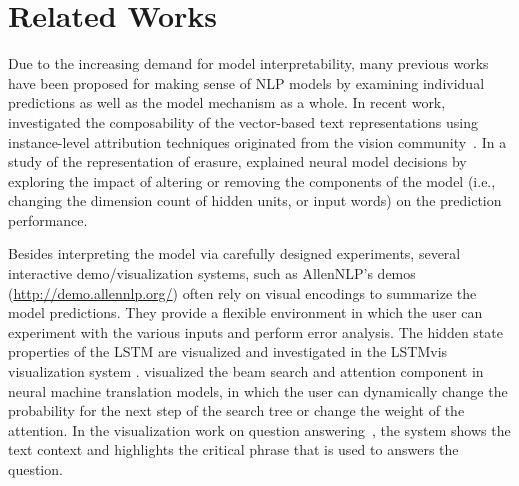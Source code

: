 \section{Related Works}
Due to the increasing demand for model interpretability, many previous works have been proposed for making sense of NLP models by examining individual predictions as well as the model mechanism as a whole. 
%
In recent work,~\citet{LiChenHovy2015} investigated the composability of the vector-based text representations using instance-level attribution techniques originated from the vision community~\cite[e.g.,][]{ZeilerFergus2014}. 
%
In a study of the representation of erasure, \citet{li2016understanding} explained neural model decisions by exploring the impact of altering or removing the components of the model (i.e., changing the dimension count of hidden units, or input words) on the prediction performance. 

Besides interpreting the model via carefully designed experiments, several interactive demo/visualization systems, such as AllenNLP's demos (\url{http://demo.allennlp.org/})  often rely on visual encodings to summarize the model predictions. They  provide a flexible environment in which the user can experiment with the various inputs and perform error analysis.
The hidden state properties of the LSTM are visualized and investigated in the LSTMvis visualization system \cite{StrobeltGehrmannPfister2018}.
\citet{lee2017interactive} visualized the beam search and attention component in neural machine translation models, in which the user can dynamically change the probability for the next step of the search tree or change the weight of the attention.
In the visualization work on question answering~\cite{ruckle2017end}, the system shows the text context and highlights the critical phrase that is used to answers the question. 


